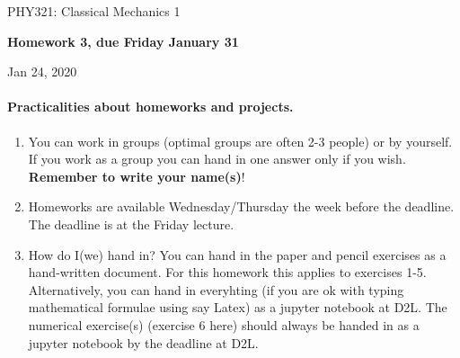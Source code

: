 \documentclass[%
oneside,                 %
final,                   %
10pt]{article}
\begin{document}

\newcommand{\exercisesection}[1]{\subsection*{#1}}






\thispagestyle{empty}

\begin{center}
{\LARGE\bf
\begin{spacing}{1.25}
PHY321: Classical Mechanics 1
\end{spacing}
}
\end{center}


\begin{center}
{\bf Homework 3, due Friday January 31${}^{}$} \\ [0mm]
\end{center}

\begin{center}
\end{center}
    

\begin{center}
Jan 24, 2020
\end{center}

\vspace{1cm}


\paragraph{Practicalities about  homeworks and projects.}
\begin{enumerate}
\item You can work in groups (optimal groups are often 2-3 people) or by yourself. If you work as a group you can hand in one answer only if you wish. \textbf{Remember to write your name(s)}!

\item Homeworks are available Wednesday/Thursday the week before the deadline. The deadline is at the Friday lecture.

\item How do I(we)  hand in?  You can hand in the paper and pencil exercises as a hand-written document. For this homework this applies to exercises 1-5. Alternatively, you can hand in everyhting (if you are ok with typing mathematical formulae using say Latex) as a jupyter notebook at D2L. The numerical exercise(s) (exercise 6 here) should always be handed in as a jupyter notebook by the deadline at D2L. 
\end{enumerate}
\end{document}
